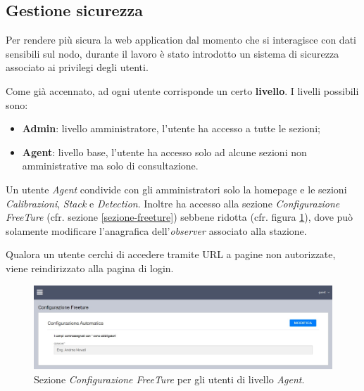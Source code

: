 \subsection{Gestione sicurezza} \label{sicurezza}

Per rendere più sicura la web application dal momento che si interagisce con dati sensibili sul nodo, durante il lavoro è stato introdotto un sistema di sicurezza associato ai privilegi degli utenti. 

Come già accennato, ad ogni utente corrisponde un certo \textbf{livello}. I livelli possibili sono:
\begin{itemize}[noitemsep,nolistsep]
    \item \textbf{Admin}: livello amministratore, l'utente ha accesso a tutte le sezioni;
    \item \textbf{Agent}: livello base, l'utente ha accesso solo ad alcune sezioni non amministrative ma solo di consultazione.
\end{itemize}

Un utente \emph{Agent} condivide con gli amministratori solo la homepage e le  sezioni \emph{Calibrazioni}, \emph{Stack} e \emph{Detection}. Inoltre ha accesso alla sezione \emph{Configurazione FreeTure} (cfr. sezione \ref{sezione-freeture}) sebbene ridotta (cfr. figura \ref{fig:freeture-ridotto}), dove può solamente modificare l'anagrafica dell'\emph{observer} associato alla stazione.

Qualora un utente cerchi di accedere tramite URL a pagine non autorizzate, viene reindirizzato alla pagina di login.

\begin{figure}[H]
    \begin{center}
    \includegraphics[width=\textwidth]{images/freeture-ridotto.jpg}
    \caption{Sezione \emph{Configurazione FreeTure} per gli utenti di livello \emph{Agent}.}
    \label{fig:freeture-ridotto}
    \end{center}
\end{figure}

